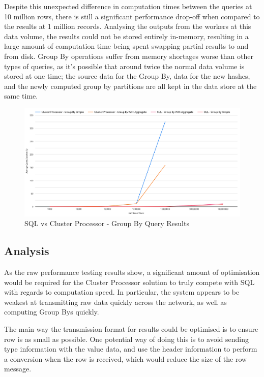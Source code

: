 Despite this unexpected difference in computation times between the queries at 10 million rows, there is still a significant performance drop-off when compared to the results at 1 million records. Analysing the outputs from the workers at this data volume, the results could not be stored entirely in-memory, resulting in a large amount of computation time being spent swapping partial results to and from disk. Group By operations suffer from memory shortages worse than other types of queries, as it's possible that around twice the normal data volume is stored at one time; the source data for the Group By, data for the new hashes, and the newly computed group by partitions are all kept in the data store at the same time.

\begin{figure}[h]
	\centering
	\includegraphics[width=0.8\linewidth]{chapters/diagrams/testing/group-by-1k-100m}
	\caption{SQL vs Cluster Processor - Group By Query Results}
	\label{fig:group-by-graph}
\end{figure}

\subsection{Analysis}
As the raw performance testing results show, a significant amount of optimisation would be required for the Cluster Processor solution to truly compete with SQL with regards to computation speed. In particular, the system appears to be weakest at transmitting raw data quickly across the network, as well as computing Group Bys quickly.

The main way the transmission format for results could be optimised is to ensure row is as small as possible. One potential way of doing this is to avoid sending type information with the value data, and use the header information to perform a conversion when the row is received, which would reduce the size of the row message. 

